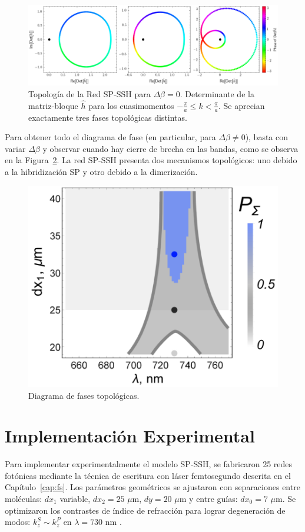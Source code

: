 \begin{figure}[H]
	\centering
	\includegraphics[width=\linewidth]{media/sp-ssh-012.png}
	\caption[Topología de la Red SP-SSH para $\Delta\beta = 0$.]{Topología de la Red SP-SSH para $\Delta\beta = 0$. Determinante de la matriz-bloque $\hat{h}$ para los cuasimomentos $-\frac{\pi}{a} \le k  < \frac{\pi}{a}$. Se aprecian exactamente tres fases topológicas distintas. \label{fig:sp-wilson}}
\end{figure}
Para obtener todo el diagrama de fase (en particular, para $\Delta \beta \neq 0$), basta con variar $\Delta \beta$ y observar cuando hay cierre de brecha en las bandas, como se observa en la Figura~\ref{fig:sp-ssh-phase-diagram}.  La red SP-SSH presenta dos mecanismos topológicos: uno debido a la hibridización SP y otro debido a la dimerización.

\begin{figure}[H]
	\centering
	\includegraphics[width=0.4\linewidth]{media/sp-ssh-phase-diagram.png}
	\caption{Diagrama de fases topológicas. \label{fig:sp-ssh-phase-diagram}}
\end{figure}



\section{Implementación Experimental}

Para implementar experimentalmente el modelo SP-SSH, se fabricaron 25 redes fotónicas mediante la técnica de escritura con láser femtosegundo descrita en el Capítulo~\ref{cap:fs}. Los parámetros geométricos se ajustaron con separaciones entre moléculas: $dx_1$ variable, $dx_2 = 25$ $\mu$m, $dy = 20$ $\mu$m y entre guías: $dx_0 = 7$ $\mu$m. Se optimizaron los contrastes de índice de refracción para lograr degeneración de modos: $k_z^S \sim k_z^P$ en $\lambda = 730$ nm \cite{interorbital}.

